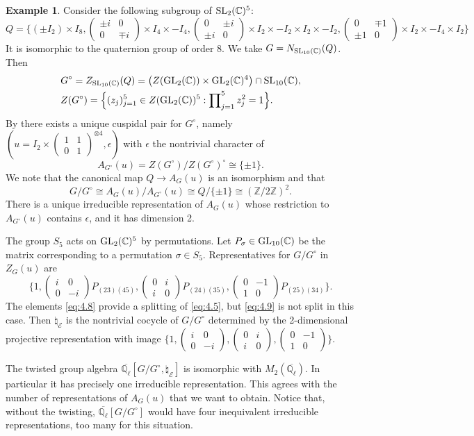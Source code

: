 \documentclass[11pt]{amsart}
\theoremstyle{definition}
\newtheorem{ex}[thm]{Example}
\newcommand{\Z}{\mathbb Z}
\newcommand{\Q}{\mathbb Q}
\newcommand{\C}{\mathbb C}
\newcommand{\matje}[4]{\left(\begin{smallmatrix} #1 & #2 \\ 
#3 & #4 \end{smallmatrix}\right)}
\def\GL{{\rm GL}}
\def\SL{{\rm SL}}
\def\cE{{\mathcal E}}
\begin{document}
\begin{ex}\label{ex:A}
Consider the following subgroup of $\SL_2 (\C)^5$:
\[
Q = \big\{ (\pm I_2) \times I_8, \matje{\pm i}{0}{0}{\mp i} \times I_4 \times -I_4,
\matje{0}{\pm i}{\pm i}{0} \times I_2 \times -I_2 \times I_2 \times -I_2,
\matje{0}{\mp 1}{\pm 1}{0} \times I_2 \times -I_4 \times I_2 \big\}
\]
It is isomorphic to the quaternion group of order 8. We take
$G = N_{\SL_{10}(\C)}(Q)$. Then
\begin{align*}
& G^\circ = Z_{\SL_{10}(\C)}(Q) = \big( Z(\GL_2 (\C)) \times \GL_2 (\C)^4 \big) \cap \SL_{10}(\C) , \\
& Z(G^\circ) = \Big\{ (z_j)_{j=1}^5 \in 
Z (\GL_2 (\C))^5 : \prod\nolimits_{j=1}^5 z_j^2 = 1 \Big\} .
\end{align*}
By \cite[\S 10.1--10.3]{Lus1} there exists a unique cuspidal pair for $G^\circ$,
namely \\ $(u = I_2 \times \matje{1}{1}{0}{1}^{\otimes 4}, \epsilon)$
with $\epsilon$ the nontrivial character of                                             
\[
A_{G^\circ}(u) = Z(G^\circ) / Z(G^\circ)^\circ \cong \{ \pm 1 \}.
\]
We note that the canonical map $Q \to A_G (u)$ is an isomorphism and that
\[
G / G^\circ \cong A_G (u) / A_{G^\circ}(u) \cong Q / \{\pm 1\} \cong (\Z / 2 \Z)^2. 
\]
There is a unique irreducible representation of $A_G (u)$ whose restriction to
$A_{G^\circ}(u)$ contains $\epsilon$, and it has dimension 2.

The group $S_5$ acts on $\GL_2 (\C)^5$ by permutations. Let $P_\sigma \in 
\GL_{10}(\C)$ be the matrix corresponding to a permutation $\sigma \in S_5$. 
Representatives for $G / G^\circ$ in $Z_G (u)$ are
\begin{equation}\label{eq:4.8}
\big\{ 1, \matje{i}{0}{0}{-i} P_{(23)(45)}, \matje{0}{i}{i}{0} P_{(24)(35)},
\matje{0}{-1}{1}{0} P_{(25)(34)} \big\} .
\end{equation}
The elements \eqref{eq:4.8} provide a splitting of \eqref{eq:4.5}, but \eqref{eq:4.9} 
is not split in this case. Then $\natural_\cE$ is the nontrivial cocycle of 
$G / G^\circ$ determined by the 2-dimensional projective representation with image 
$\big\{1, \matje{i}{0}{0}{-i}, \matje{0}{i}{i}{0},\matje{0}{-1}{1}{0} \big\}$. 

The twisted group algebra $\overline{\Q_{\ell}}[G / G^\circ,\natural_\cE]$ is isomorphic
with $M_2 (\overline{\Q_{\ell}})$. In particular it has precisely one irreducible
representation. This agrees with the number of representations of $A_G (u)$ that 
we want to obtain. Notice that, without the twisting, $\overline{\Q_{\ell}}[G/G^\circ]$
would have four inequivalent irreducible representations, too many for this situation.
\end{ex}
\end{document}
